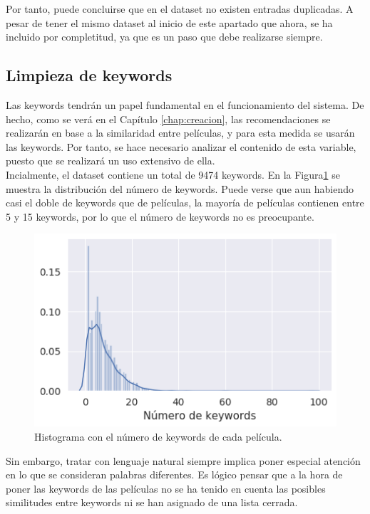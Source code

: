 Por tanto, puede concluirse que en el dataset no existen entradas duplicadas. A pesar de tener el mismo dataset al inicio de este apartado que ahora, se ha incluido por completitud, ya que es un paso que debe realizarse siempre.

\subsection{Limpieza de keywords}

Las keywords tendrán un papel fundamental en el funcionamiento del sistema. De hecho, como se verá en el Capítulo \ref{chap:creacion}, las recomendaciones se realizarán en base a la similaridad entre películas, y para esta medida se usarán las keywords. Por tanto, se hace necesario analizar el contenido de esta variable, puesto que se realizará un uso extensivo de ella.\\

Incialmente, el dataset contiene un total de 9474 keywords. En la Figura\ref{fig:keywords_histogram} se muestra la distribución del número de keywords. Puede verse que aun habiendo casi el doble de keywords que de películas, la mayoría de películas contienen entre 5 y 15 keywords, por lo que el número de keywords no es preocupante.
\begin{figure}[H]
    \centering
    \captionsetup{width=10cm}
    \includegraphics[width=12cm]{contenido/imagenes/keyword_histogram.png}
    \caption{Histograma con el número de keywords de cada película.}
    \label{fig:keywords_histogram}
\end{figure}

Sin embargo, tratar con lenguaje natural siempre implica poner especial atención en lo que se consideran palabras diferentes. Es lógico pensar que a la hora de poner las keywords de las películas no se ha tenido en cuenta las posibles similitudes entre keywords ni se han asignado de una lista cerrada.\\

